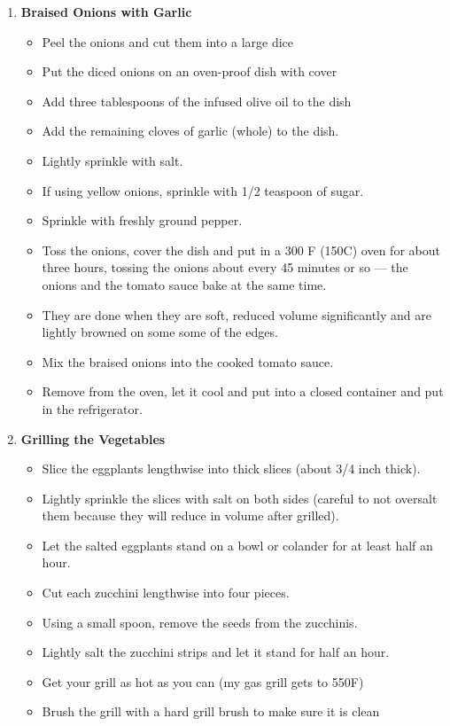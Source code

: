 \documentclass [11pt, letterpaper] {article}
\begin{document}
\begin{description}
\begin{enumerate}
\begin{itemize}
	\end{itemize}
	\item {\bf Braised Onions with Garlic}
	\begin{itemize}
        		\item Peel the onions and cut them into a large dice
		\item Put the diced onions on an oven-proof dish with cover 
		\item Add three tablespoons of the infused olive oil to the dish
		\item Add the remaining cloves of garlic (whole) to the dish.
		\item Lightly sprinkle with salt.
		\item If using yellow onions, sprinkle with 1/2 teaspoon of sugar.
		\item Sprinkle with freshly ground pepper.
		\item Toss the onions, cover the dish and put in a 300 F (150C) oven for about three hours, tossing the onions about every 45 minutes or so --- the onions and the tomato sauce bake at the same time.
		\item They are done when they are soft, reduced volume significantly and are lightly browned on some some of the edges.
		\item Mix the braised onions into the cooked tomato sauce.
		\item Remove from the oven, let it cool and put into a closed container and put in the refrigerator.
	\end{itemize}
	\item {\bf Grilling the Vegetables}
	\begin{itemize}	
		\item  Slice the eggplants lengthwise into thick slices (about 3/4 inch thick).
		\item Lightly sprinkle the slices with salt on both sides (careful to not oversalt them because they will reduce in volume after grilled).
		\item Let the salted eggplants stand on a bowl or colander for at least half an hour.
		\item Cut each zucchini lengthwise into four pieces.
		\item Using a small spoon, remove the seeds from the zucchinis. 
		\item Lightly salt the zucchini strips and let it stand for half an hour.
		\item Get your grill as hot as you can (my gas grill gets to 550F)
	 	\item Brush the grill with a hard grill brush to make sure it is clean

\end{itemize}
\end{enumerate}
\end{description}
\end{document}
